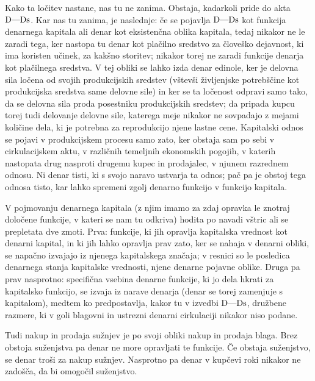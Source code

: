 \documentclass[kapital_02.tex]{subfiles}
\begin{document}
Kako ta ločitev nastane, nas tu ne zanima. Obstaja, kadarkoli pride do akta \( \textrm{D}\textrm{---}\textrm{Ds} \). Kar nas tu zanima, je naslednje: če se pojavlja \( \textrm{D}\textrm{---}\textrm{Ds} \) kot funkcija denarnega kapitala ali denar kot eksistenčna oblika kapitala, tedaj nikakor ne le zaradi tega, ker nastopa tu denar kot plačilno sredstvo za človeško dejavnost, ki ima koristen učinek, za kakšno storitev; nikakor torej ne zaradi funkcije denarja kot plačilnega sredstva. V tej obliki se lahko izda denar edinole, ker je delovna sila ločena od svojih produkcijskih sredstev (vštevši življenjske potrebščine kot produkcijska sredstva same delovne sile) in ker se ta ločenost odpravi samo tako, da se delovna sila proda posestniku produkcijskih sredstev; da pripada kupcu torej tudi delovanje delovne sile, katerega meje nikakor ne sovpadajo z mejami količine dela, ki je potrebna za reprodukcijo njene lastne cene. Kapitalski odnos se pojavi v produkcijskem procesu samo zato, ker obstaja sam po sebi v cirkulacijskem aktu, v različnih temeljnih ekonomskih pogojih, v katerih nastopata drug nasproti drugemu kupec in prodajalec, v njunem razrednem odnosu. Ni denar tisti, ki s svojo naravo ustvarja ta odnos; pač pa je obstoj tega odnosa tisto, kar lahko spremeni zgolj denarno funkcijo v funkcijo kapitala.

V pojmovanju denarnega kapitala (z njim imamo za zdaj opravka le znotraj določene funkcije, v kateri se nam tu odkriva) hodita po navadi vštric ali se prepletata dve zmoti. Prva: funkcije, ki jih opravlja kapitalska vrednost kot denarni kapital, in ki jih lahko opravlja prav zato, ker se nahaja v denarni obliki, se napačno izvajajo iz njenega kapitalskega značaja; v resnici so le posledica denarnega stanja kapitalske vrednosti, njene denarne pojavne oblike. Druga pa prav nasprotno: specifična vsebina denarne funkcije, ki jo dela hkrati za kapitalsko funkcijo, se izvaja iz narave denarja (denar se torej zamenjuje s kapitalom), medtem ko predpostavlja, kakor tu v izvedbi \( \textrm{D}\textrm{---}\textrm{Ds} \), družbene razmere, ki v goli blagovni in ustrezni denarni cirkulaciji nikakor niso podane.

Tudi nakup in prodaja sužnjev je po svoji obliki nakup in prodaja blaga. Brez obstoja suženjstva pa denar ne more opravljati te funkcije. Če obstaja suženjstvo, se denar troši za nakup sužnjev. Nasprotno pa denar v kupčevi roki nikakor ne zadošča, da bi omogočil suženjstvo.
\end{document}
